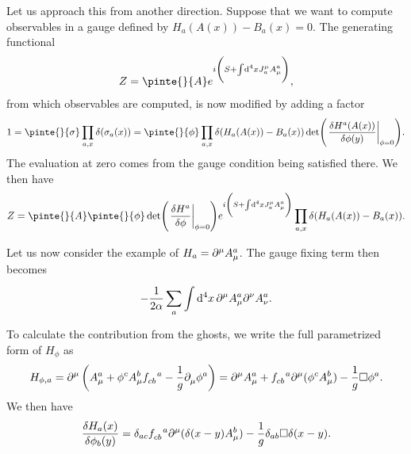 Let us approach this from another direction. Suppose that we want to compute observables in a gauge defined by $H_{a}(A(x)) - B_{a}(x) = 0$. The generating functional
\begin{align*}
	Z = \pinte{}{A}e^{i\left(S + \integ[4]{}{}{x}{J^{\mu}_{a}A^{a}_{\mu}}\right)},
\end{align*}
from which observables are computed, is now modified by adding a factor
\begin{align*}
	1 = \pinte{}{\sigma}\prod\limits_{a, x}\delta(\sigma_{a}(x)) = \pinte{}{\phi}\prod\limits_{a, x}\delta(H_{a}(A(x)) - B_{a}(x))\det(\eval{\fdv{H^{a}(A(x))}{\phi(y)}}_{\phi = 0}).
\end{align*}
The evaluation at zero comes from the gauge condition being satisfied there. We then have
\begin{align*}
	Z = \pinte{}{A}\pinte{}{\phi}\det(\eval{\fdv{H^{a}}{\phi}}_{\phi = 0})e^{i\left(S + \integ[4]{}{}{x}{J^{\mu}_{a}A^{a}_{\mu}}\right)}\prod\limits_{a, x}\delta(H_{a}(A(x)) - B_{a}(x)).
\end{align*}

Let us now consider the example of $H_{a} = \partial^{\mu}_{}A_{\mu}^{a}$. The gauge fixing term then becomes
\begin{align*}
	-\frac{1}{2\alpha}\sum\limits_{a}\int\limits_{}^{}\dd[4]{x}\partial^{\mu}_{}A_{\mu}^{a}\partial^{\nu}_{}A_{\nu}^{a}.
\end{align*}
To calculate the contribution from the ghosts, we write the full parametrized form of $H_{\phi}$ as
\begin{align*}
	H_{\phi, a} = \del{\mu}{}\left(A_{\mu}^{a} + \phi^{c}A_{\mu}^{b}\srconst{cb}{a} - \frac{1}{g}\del{}{\mu}\phi^{a}\right) = \del{\mu}{}A_{\mu}^{a} + \srconst{cb}{a}\del{\mu}{}(\phi^{c}A_{\mu}^{b}) - \frac{1}{g}\dalem\phi^{a}.
\end{align*}
We then have
\begin{align*}
	\fdv{H_{a}(x)}{\phi_{b}(y)} = \delta_{ac}\srconst{cb}{a}\del{\mu}{}(\delta(x - y)A_{\mu}^{b}) - \frac{1}{g}\delta_{ab}\dalem\delta(x - y).
\end{align*}
